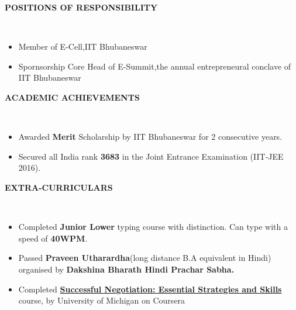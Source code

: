 \documentclass[a4paper,10pt]{article}
\newcommand{\lsep}{-0.5cm}
\newcommand{\resheading}[1]{{\small \colorbox{mygrey}{\begin{minipage}{0.975\textwidth}{\textbf{#1 \vphantom{p\^{E}}}}\end{minipage}}}}
\begin{document}
\resheading{\textbf{POSITIONS OF RESPONSIBILITY} }\\[\lsep]
\begin{itemize}
\item \noindent Member of E-Cell,IIT Bhubaneswar
\item \noindent Spornsorship Core Head of E-Summit,the annual entrepreneural conclave of IIT Bhubaneswar
\end{itemize}

\resheading{\textbf{ACADEMIC ACHIEVEMENTS} }\\[\lsep]
\begin{itemize}
\item \noindent Awarded \textbf{Merit} Scholarship by IIT Bhubaneswar for 2 consecutive years.
\item \noindent Secured all India rank \textbf{3683} in the Joint Entrance Examination (IIT‐JEE 2016). 
\end{itemize}

\resheading{\textbf{EXTRA-CURRICULARS} }\\[\lsep]
\begin{itemize}
\item \noindent Completed  \textbf {Junior Lower} typing course with distinction. Can type with a speed of \textbf{40WPM}.  
\item \noindent Passed \textbf{Praveen Utharardha}(long distance B.A equivalent in Hindi) organised by \textbf{Dakshina Bharath Hindi Prachar Sabha.} 
\item \noindent Completed \href{https://www.coursera.org/account/accomplishments/certificate/MVNXF4M8MJ76}{\textbf{Successful Negotiation: Essential Strategies and
Skills}} course, by University of Michigan on Coursera
\end{itemize}
\end{document}
